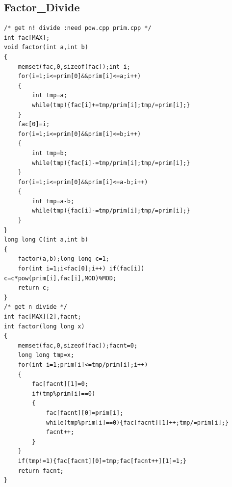 \documentclass[twoside]{article}
\begin{document}
\subsection{Factor_Divide}
\begin{lstlisting}
/* get n! divide :need pow.cpp prim.cpp */
int fac[MAX];
void factor(int a,int b)
{
    memset(fac,0,sizeof(fac));int i;
    for(i=1;i<=prim[0]&&prim[i]<=a;i++)
    {
        int tmp=a;
        while(tmp){fac[i]+=tmp/prim[i];tmp/=prim[i];}
    }
    fac[0]=i;
    for(i=1;i<=prim[0]&&prim[i]<=b;i++)
    {
        int tmp=b;
        while(tmp){fac[i]-=tmp/prim[i];tmp/=prim[i];}
    }
    for(i=1;i<=prim[0]&&prim[i]<=a-b;i++)
    {
        int tmp=a-b;
        while(tmp){fac[i]-=tmp/prim[i];tmp/=prim[i];}
    }
}
long long C(int a,int b)
{
    factor(a,b);long long c=1;
    for(int i=1;i<fac[0];i++) if(fac[i]) c=c*pow(prim[i],fac[i],MOD)%MOD;
    return c;
}
/* get n divide */
int fac[MAX][2],facnt;
int factor(long long x)
{
    memset(fac,0,sizeof(fac));facnt=0;
    long long tmp=x;
    for(int i=1;prim[i]<=tmp/prim[i];i++)
    {
        fac[facnt][1]=0;
        if(tmp%prim[i]==0)
        {
            fac[facnt][0]=prim[i];
            while(tmp%prim[i]==0){fac[facnt][1]++;tmp/=prim[i];}
            facnt++;
        }
    }
    if(tmp!=1){fac[facnt][0]=tmp;fac[facnt++][1]=1;}
    return facnt;
}
\end{lstlisting}
\end{document}
